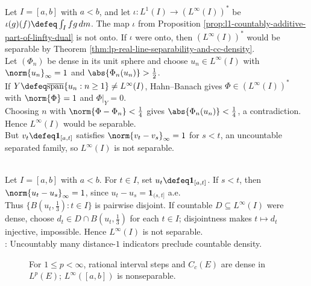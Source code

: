 \begin{remark} \label{rem:l1-does-not-exhaust-linfty-dual} \\
Let $I=[a,b]$ with $a<b$, and let $\iota:L^1(I)\to(L^\infty(I))^*$ be $\iota(g)(f)\defeq\int_I fg\,dm$. The map $\iota$ from Proposition \ref{prop:l1-countably-additive-part-of-linfty-dual} is not onto. If $\iota$ were onto, then $(L^\infty(I))^*$ would be separable by Theorem \ref{thm:lp-real-line-separability-and-cc-density}.\\
Let $(\Phi_n)$ be dense in its unit sphere and choose $u_n\in L^\infty(I)$ with $\norm{u_n}_\infty=1$ and $\abs{\Phi_n(u_n)}>\frac{1}{2}$.\\
If $Y\defeq\overline{\operatorname{span}}\{u_n:n\geq1\}\ne L^\infty(I)$, Hahn--Banach gives $\Phi\in(L^\infty(I))^*$ with $\norm{\Phi}=1$ and $\Phi|_Y=0$.\\
Choosing $n$ with $\norm{\Phi-\Phi_n}<\frac{1}{4}$ gives $\abs{\Phi_n(u_n)}<\frac{1}{4}$, a contradiction. Hence $L^\infty(I)$ would be separable.\\
But $v_t\defeq\mathbf{1}_{[a,t]}$ satisfies $\norm{v_t-v_s}_\infty=1$ for $s<t$, an uncountable separated family, so $L^\infty(I)$ is not separable.
\end{remark}

\begin{example} \label{ex:linfty-interval-not-separable} \\
Let $I=[a,b]$ with $a<b$. For $t\in I$, set $u_t\defeq\mathbf{1}_{[a,t]}$. If $s<t$, then $\norm{u_t-u_s}_\infty=1$, since $u_t-u_s=\mathbf{1}_{(s,t]}$ a.e.\\
Thus $\{B(u_t,\frac{1}{3}):t\in I\}$ is pairwise disjoint. If countable $D\subseteq L^\infty(I)$ were dense, choose $d_t\in D\cap B(u_t,\frac{1}{3})$ for each $t\in I$; disjointness makes $t\mapsto d_t$ injective, impossible. Hence $L^\infty(I)$ is not separable.\\
: Uncountably many distance-$1$ indicators preclude countable density.
\end{example}

\begin{figure}[H]
  \centering
  
  \caption{For $1\leq p<\infty$, rational interval steps and $C_c(E)$ are dense in $L^p(E)$; $L^\infty([a,b])$ is nonseparable.}
  \label{fig:lp-density-separability-chain}
\end{figure}

